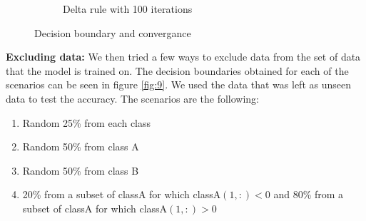 \documentclass[a4paper]{article}
\begin{document}
\begin{figure}[htb]
\begin{subfigure}{0.4\textwidth}
        \caption{Delta rule with 100 iterations}
        \label{fig:new-data-convergance}
    \end{subfigure}
    \caption{Decision boundary and convergance}
    \label{fig:8}
\end{figure}

\textbf{Excluding data:} We then tried a few ways to exclude data from the set of data that the model is trained on. The decision boundaries obtained for each of the scenarios can be seen in figure \ref{fig:9}. We used the data that was left as unseen data to test the accuracy. The scenarios are the following:
\begin{enumerate}
    \item Random 25\% from each class
    \item Random 50\% from class A
    \item Random 50\% from class B
    \item 20\% from a subset of classA for which classA$(1,:)<0$ and 80\% from a subset of classA for which classA$(1,:)>0$
\end{enumerate}
\end{document}
